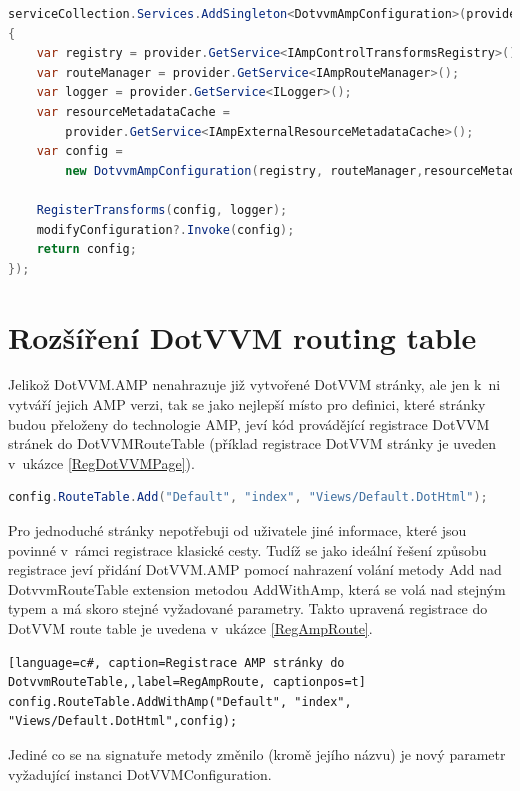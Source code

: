 \begin{lstlisting}[language=c#, caption=Registrace DotvvmAmpConfiguration,label=RegAmpConfig,captionpos=t]
serviceCollection.Services.AddSingleton<DotvvmAmpConfiguration>(provider =>
{
    var registry = provider.GetService<IAmpControlTransformsRegistry>();
    var routeManager = provider.GetService<IAmpRouteManager>();
    var logger = provider.GetService<ILogger>();
    var resourceMetadataCache =
        provider.GetService<IAmpExternalResourceMetadataCache>();
    var config =
        new DotvvmAmpConfiguration(registry, routeManager,resourceMetadataCache);
        
    RegisterTransforms(config, logger);
    modifyConfiguration?.Invoke(config);
    return config;
});
\end{lstlisting}
\section{Rozšíření DotVVM routing table}
Jelikož DotVVM.AMP nenahrazuje již vytvořené DotVVM stránky, ale jen k~ni vytváří jejich AMP verzi, tak se jako nejlepší místo pro definici, které stránky budou přeloženy do technologie AMP, jeví kód provádějící registrace DotVVM stránek do DotVVMRouteTable (příklad registrace DotVVM stránky je uveden v~ukázce \ref{RegDotVVMPage}).

\begin{lstlisting}[language=c#, caption=Registrace DotVVM stránky do DotvvmRouteTable,label=RegDotVVMPage,captionpos=t]
config.RouteTable.Add("Default", "index", "Views/Default.DotHtml");
\end{lstlisting}

Pro jednoduché stránky nepotřebuji od uživatele jiné informace, které jsou povinné v~rámci registrace klasické cesty.
Tudíž se jako ideální řešení způsobu registrace jeví přidání DotVVM.AMP pomocí nahrazení volání metody Add nad DotvvmRouteTable extension metodou AddWithAmp, která se volá nad stejným typem a má skoro stejné vyžadované parametry. Takto upravená registrace do DotVVM route table je uvedena v~ukázce \ref{RegAmpRoute}.

\begin{lstlisting}[language=c#, caption=Registrace AMP stránky do DotvvmRouteTable,,label=RegAmpRoute, captionpos=t]
config.RouteTable.AddWithAmp("Default", "index", "Views/Default.DotHtml",config);
\end{lstlisting}

Jediné co se na signatuře metody změnilo (kromě jejího názvu) je nový parametr vyžadující instanci DotVVMConfiguration.

